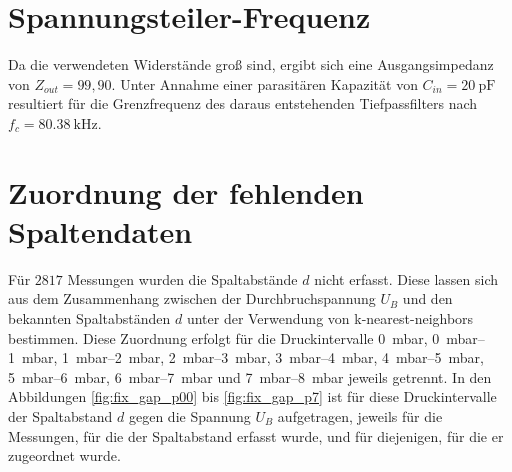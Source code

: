 \section{Spannungsteiler-Frequenz}
Da die verwendeten Widerstände groß sind, ergibt sich  eine Ausgangsimpedanz von \(Z_{out} = 99{,}90\). Unter Annahme einer parasitären Kapazität von \(C_{in} = \SI{20}{\pico\farad}\) resultiert für die Grenzfrequenz des daraus entstehenden Tiefpassfilters nach  \(f_c = \SI{80,38}{\kilo\hertz}\).

\section{Zuordnung der fehlenden Spaltendaten}
Für \(2817\) Messungen wurden die Spaltabstände \(d\) nicht erfasst. Diese lassen sich aus dem Zusammenhang zwischen der Durchbruchspannung \(U_B\) und den bekannten Spaltabständen \(d\) unter der Verwendung von k-nearest-neighbors bestimmen. Diese Zuordnung erfolgt für die Druckintervalle \SI{0}{\milli\bar}, \SIrange{0}{1}{\milli\bar}, \SIrange{1}{2}{\milli\bar}, \SIrange{2}{3}{\milli\bar}, \SIrange{3}{4}{\milli\bar}, \SIrange{4}{5}{\milli\bar}, \SIrange{5}{6}{\milli\bar}, \SIrange{6}{7}{\milli\bar} und \SIrange{7}{8}{\milli\bar} jeweils getrennt. In den Abbildungen \ref{fig:fix_gap_p00} bis \ref{fig:fix_gap_p7} ist für diese Druckintervalle der Spaltabstand \(d\) gegen die Spannung \(U_B\) aufgetragen, jeweils für die Messungen, für die der Spaltabstand erfasst wurde, und für diejenigen, für die er zugeordnet wurde. 


